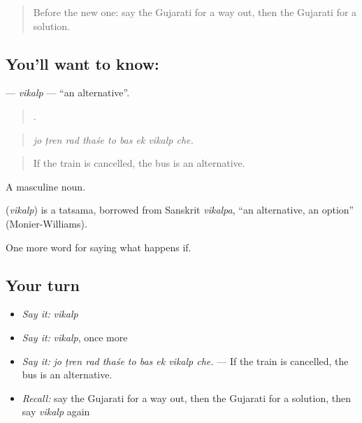 \begin{quote}
Before the new one: say the Gujarati for a way out, then the Gujarati for a solution.
\end{quote}

\subsection*{You'll want to know: }
\textbf{} — \emph{vikalp} — \textquotedblleft{}an alternative\textquotedblright{}.

\begin{quote}
        .
\end{quote}

\begin{quote}
\emph{jo ṭren rad thaśe to bas ek vikalp che.}
\end{quote}

\begin{quote}
If the train is cancelled, the bus is an alternative.
\end{quote}

A masculine noun.

\begin{cousinweb}
\textbf{} (\emph{vikalp}) is a tatsama, borrowed from Sanskrit \emph{vikalpa}, \textquotedblleft{}an alternative, an option\textquotedblright{} (Monier-Williams).
\end{cousinweb}

\begin{grammarlens}[title={What you've built}]
One more word for saying what happens if.
\end{grammarlens}

\subsection*{Your turn}
\begin{itemize}
\raggedright
  \item \emph{Say it:} \emph{vikalp}
  \item \emph{Say it:} \emph{vikalp}, once more
  \item \emph{Say it:} \emph{jo ṭren rad thaśe to bas ek vikalp che.} — If the train is cancelled, the bus is an alternative.
  \item \emph{Recall:} say the Gujarati for a way out, then the Gujarati for a solution, then say \emph{vikalp} again
\end{itemize}

